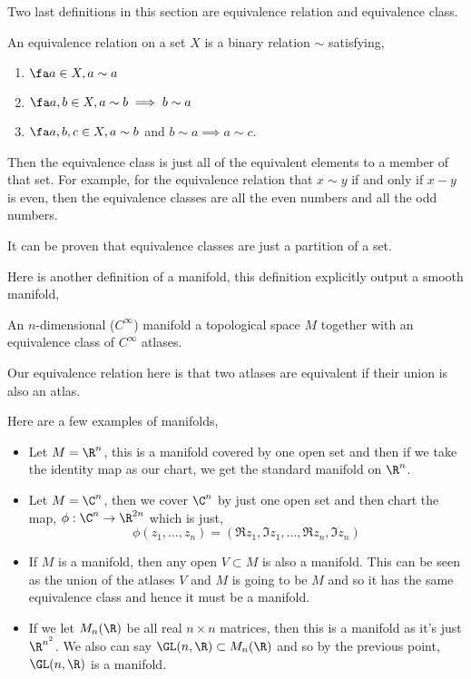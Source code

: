 \noindent
Two last definitions in this section are equivalence relation and equivalence class.
\begin{ndefi}
  An equivalence relation on a set $X$ is a binary relation $\sim$ satisfying,
  \begin{enumerate}
    \item $\fa a \in X, a \sim a$
    \item $\fa a, b \in X, a \sim b \implies b \sim a$
    \item $\fa a, b, c \in X, a \sim b$ and $b \sim a \implies a \sim c$.
  \end{enumerate}
\end{ndefi}

\noindent
Then the equivalence class is just all of the equivalent elements to a member of that set. For example, for the equivalence relation that $x \sim y$ if and only if $x - y$ is even, then the equivalence classes are all the even numbers and all the odd numbers.

\begin{remark}
   It can be proven that equivalence classes are just a partition of a set. \cite{Buzzard-2020}
\end{remark}

\noindent
Here is another definition of a manifold, this definition explicitly output a smooth manifold,
\begin{ndefi}
  An $n$-dimensional ($C^\infty$) manifold a topological space $M$ together with an equivalence class of $C^\infty$ atlases.
\end{ndefi}
\begin{remark}
   Our equivalence relation here is that two atlases are equivalent if their union is also an atlas.
\end{remark}

Here are a few examples of manifolds,
\begin{itemize}
  \item Let $M = \R^n$, this is a manifold covered by one open set and then if we take the identity map as our chart, we get the standard manifold on $\R^n$.
  \item Let $M = \C^n$, then we cover $\C^n$ by just one open set and then chart the map, $\phi : \C^n \to \R^{2n}$ which is  just,
  $$ \phi (z_1, \dots, z_n) = (\Re z_1, \Im z_1, \dots, \Re z_n, \Im z_n) $$
  \item If $M$ is a manifold, then any open $V \subset M$ is also a manifold. This can be seen as the union of the atlases $V$ and $M$ is going to be $M$ and so it has the same equivalence class and hence it must be a manifold.
  \item If we let $M_n (\R)$ be all real $n \times n$ matrices, then this is a manifold as it's just $\R^{n^2}$. We also can say $\GL(n, \R) \subset M_n(\R)$ and so by the previous point, $\GL(n, \R)$ is a manifold.
\end{itemize}

